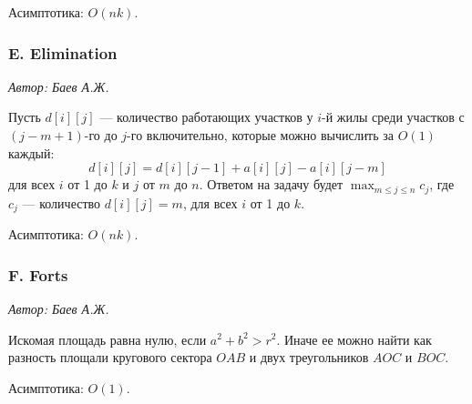 \documentclass[10pt, a4paper]{article}
\newcommand{\problemauthor}[1]{
\begin{flushright}
\textit{Автор: #1}
\end{flushright}
}
\begin{document}
Асимптотика: $O(n k)$.



\subsubsection*{E. Elimination}

\problemauthor{ Баев А.Ж.}

Пусть $d[i][j]$ --- количество работающих участков у $i$-й жилы среди участков с $(j-m+1)$-го до $j$-го включительно, которые можно вычислить за $O(1)$ каждый:$$d[i][j] = d[i][j-1] + a[i][j] - a[i][j-m]$$
для всех $i$ от 1 до $k$ и $j$ от $m$ до $n$.
Ответом на задачу будет $\max_{m\leqslant j \leqslant n} c_j$,
где $c_j$ --- количество $d[i][j] = m$, для всех $i$ от 1 до $k$.

Асимптотика: $O(n k)$.



\subsubsection*{F. Forts}

\problemauthor{ Баев А.Ж.}

\begin{center}
\end{center}

Искомая площадь равна нулю, если $a^2 + b^2 > r^2$. Иначе ее можно найти как разность площали кругового сектора $OAB$ и двух треугольников $AOC$ и $BOC$.

Асимптотика: $O(1)$.
\end{document}
